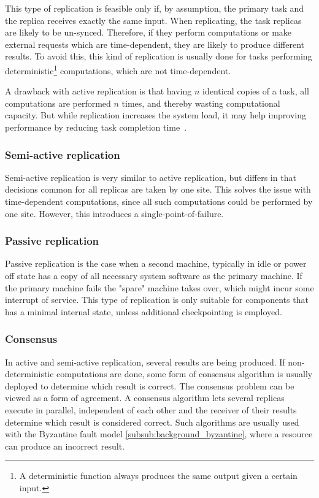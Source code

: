 \documentclass{cslthse-msc}
\begin{document}
This type of replication is feasible only if, by assumption, the primary task and the replica receives exactly the same input. When replicating, the task replicas are likely to be un-synced. Therefore, if they perform computations or make external requests which are time-dependent, they are likely to produce different results. To avoid this, this kind of replication is usually done for tasks performing deterministic\footnote{A deterministic function always produces the same output given a certain input.} computations, which are not time-dependent.

A drawback with active replication is that having $n$ identical copies of a task, all computations are performed $n$ times, and thereby wasting computational capacity. But while replication increases the system load, it may help improving performance by reducing task completion time~\cite{improvingPerformanceReplication}.

\subsubsection{Semi-active replication} \label{subsec:semi_active_replication}
Semi-active replication is very similar to active replication, but differs in that decisions common for all replicas are taken by one site. This solves the issue with time-dependent computations, since all such computations could be performed by one site. However, this introduces a single-point-of-failure. %

\subsubsection{Passive replication} \label{subsec:passive_replication}
Passive replication is the case when a second machine, typically in idle or power off state has a copy of all necessary system software as the primary machine. If the primary machine fails the "spare" machine takes over, which might incur some interrupt of service. This type of replication is only suitable for components that has a minimal internal state, unless additional checkpointing is employed.

\subsubsection{Consensus} \label{subsub:consensus}
In active and semi-active replication, several results are being produced. If non-deterministic computations are done, some form of consensus algorithm is usually deployed to determine which result is correct. The consensus problem can be viewed as a form of agreement. A consensus algorithm lets several replicas execute in parallel, independent of each other and the receiver of their results determine which result is considered correct. Such algorithms are usually used with the Byzantine fault model \cref{subsub:background_byzantine}, where a resource can produce an incorrect result.
\end{document}
